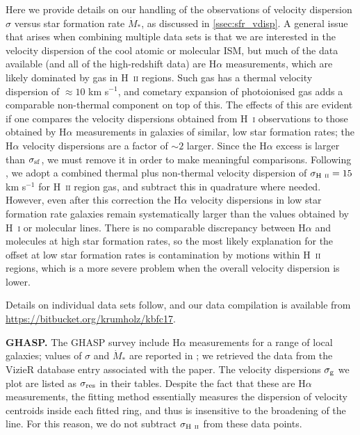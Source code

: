 \documentclass[useAMS,usenatbib]{mn2e}
\begin{document}
\begin{appendix}
Here we provide details on our handling of the observations of velocity dispersion $\sigma$ versus star formation rate $\dot{M}_*$, as discussed in \autoref{ssec:sfr_vdisp}. A general issue that arises when combining multiple data sets is that we are interested in the velocity dispersion of the cool atomic or molecular ISM, but much of the data available (and all of the high-redshift data) are H$\alpha$ measurements, which are likely dominated by gas in H~\textsc{ii} regions. Such gas has a thermal velocity dispersion of $\approx 10$ km s$^{-1}$, and cometary expansion of photoionised gas adds a comparable non-thermal component on top of this. The effects of this are evident if one compares the velocity dispersions obtained from H~\textsc{i} observations to those obtained by H$\alpha$ measurements in galaxies of similar, low star formation rates; the H$\alpha$ velocity dispersions are a factor of $\sim 2$ larger. Since the H$\alpha$ excess is larger than $\sigma_{\rm sf}$, we must remove it in order to make meaningful comparisons. Following \citet{krumholz16a}, we adopt a combined thermal plus non-thermal velocity dispersion of $\sigma_{\rm H~\textsc{ii}} = 15$ km s$^{-1}$ for H~\textsc{ii} region gas, and subtract this in quadrature where needed. However, even after this correction the H$\alpha$ velocity dispersions in low star formation rate galaxies remain systematically larger than the values obtained by H~\textsc{i} or molecular lines. There is no comparable discrepancy between H$\alpha$ and molecules at high star formation rates, so the most likely explanation for the offset at low star formation rates is contamination by motions within H~\textsc{ii} regions, which is a more severe problem when the overall velocity dispersion is lower.

Details on individual data sets follow, and our data compilation is available from \url{https://bitbucket.org/krumholz/kbfc17}.

\textbf{GHASP.} The GHASP survey include H$\alpha$ measurements for a range of local galaxies; values of $\sigma$ and $\dot{M}_*$ are reported in \citet{epinat08a}; we retrieved the data from the VizieR database entry associated with the paper. The velocity dispersions $\sigma_{\rm g}$ we plot are listed as $\sigma_{\rm res}$ in their tables. Despite the fact that these are H$\alpha$ measurements, the fitting method essentially measures the dispersion of velocity centroids inside each fitted ring, and thus is insensitive to the broadening of the line. For this reason, we do not subtract $\sigma_{\rm H~\textsc{ii}}$ from these data points.


\end{appendix}
\end{document}
